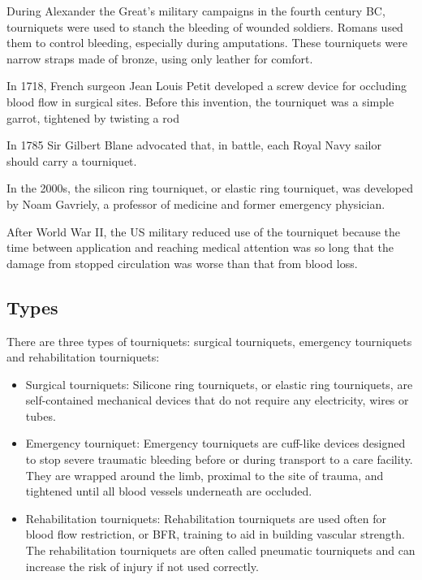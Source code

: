 \documentclass[12pt]{article}
\begin{document}
During Alexander the Great’s military campaigns in the fourth century BC, tourniquets were used to stanch the bleeding of wounded soldiers. Romans used them to control bleeding, especially during amputations. These tourniquets were narrow straps made of bronze, using only leather for comfort.


In 1718, French surgeon Jean Louis Petit developed a screw device for occluding blood flow in surgical sites. Before this invention, the tourniquet was a simple garrot, tightened by twisting a rod


In 1785 Sir Gilbert Blane advocated that, in battle, each Royal Navy sailor should carry a tourniquet.


In the 2000s, the silicon ring tourniquet, or elastic ring tourniquet, was developed by Noam Gavriely, a professor of medicine and former emergency physician.


After World War II, the US military reduced use of the tourniquet because the time between application and reaching medical attention was so long that the damage from stopped circulation was worse than that from blood loss.


\subsection{Types}

There are three types of tourniquets: surgical tourniquets, emergency tourniquets and rehabilitation tourniquets:

\begin{itemize}

  \item Surgical tourniquets: Silicone ring tourniquets, or elastic ring tourniquets, are self-contained mechanical devices that do not require any electricity, wires or tubes.
  \item Emergency tourniquet: Emergency tourniquets are cuff-like devices designed to stop severe traumatic bleeding before or during transport to a care facility. They are wrapped around the limb, proximal to the site of trauma, and tightened until all blood vessels underneath are occluded.
  \item Rehabilitation tourniquets: Rehabilitation tourniquets are used often for blood flow restriction, or BFR, training to aid in building vascular strength. The rehabilitation tourniquets are often called pneumatic tourniquets and can increase the risk of injury if not used correctly.
  
 \end{itemize}
 
 
\end{document}
